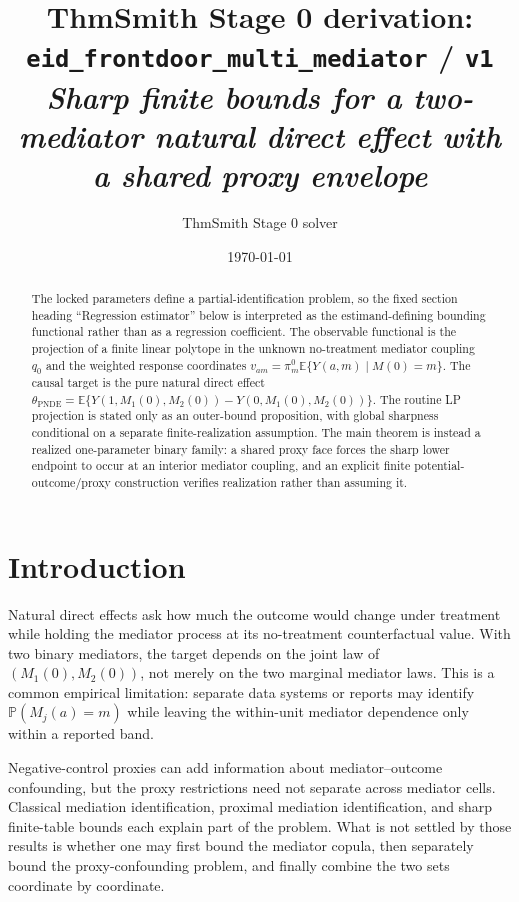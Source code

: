 \documentclass[11pt]{article}
\title{ThmSmith Stage 0 derivation: \texttt{eid\_frontdoor\_multi\_mediator} / \texttt{v1}%
  \\ \large\textit{Sharp finite bounds for a two-mediator natural direct effect with a shared proxy envelope}}
\author{ThmSmith Stage 0 solver}
\date{\today}
\newcommand{\E}{\mathbb{E}}
\renewcommand{\Pr}{\mathbb{P}}
\theoremstyle{definition}
\theoremstyle{plain}
\theoremstyle{remark}
\begin{document}
\maketitle


\begin{abstract}
The locked parameters define a partial-identification problem, so the fixed
section heading ``Regression estimator'' below is interpreted as the
estimand-defining bounding functional rather than as a regression coefficient.
The observable functional is the projection of a finite linear polytope in the
unknown no-treatment mediator coupling \(q_0\) and the weighted response
coordinates \(v_{am}=\pi^0_m\E\{Y(a,m)\mid M(0)=m\}\).  The causal target is
the pure natural direct effect
\(\theta_{\mathrm{PNDE}}=\E\{Y(1,M_1(0),M_2(0))-Y(0,M_1(0),M_2(0))\}\).
The routine LP projection is stated only as an outer-bound proposition, with
global sharpness conditional on a separate finite-realization assumption.  The
main theorem is instead a realized one-parameter binary family: a shared proxy
face forces the sharp lower endpoint to occur at an interior mediator coupling,
and an explicit finite potential-outcome/proxy construction verifies
realization rather than assuming it.
\end{abstract}

\section{Introduction}
Natural direct effects ask how much the outcome would change under treatment
while holding the mediator process at its no-treatment counterfactual value.
With two binary mediators, the target depends on the joint law of
\((M_1(0),M_2(0))\), not merely on the two marginal mediator laws.  This is a
common empirical limitation: separate data systems or reports may identify
\(\Pr(M_j(a)=m)\) while leaving the within-unit mediator dependence only within
a reported band.

Negative-control proxies can add information about mediator--outcome
confounding, but the proxy restrictions need not separate across mediator
cells.  Classical mediation identification, proximal mediation identification,
and sharp finite-table bounds each explain part of the problem.  What is not
settled by those results is whether one may first bound the mediator copula,
then separately bound the proxy-confounding problem, and finally combine the
two sets coordinate by coordinate.
\end{document}
